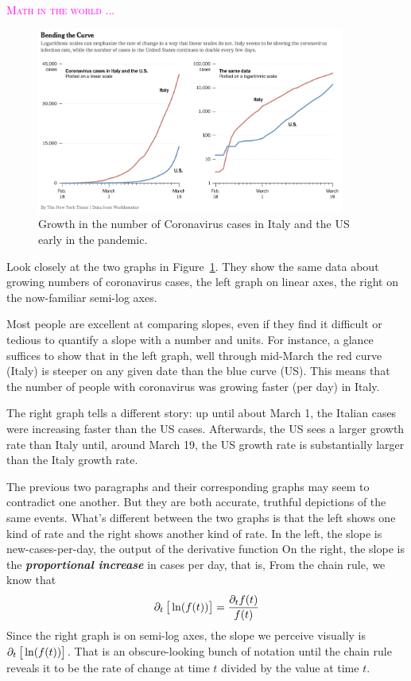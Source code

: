 \documentclass[
  letterpaper,
  DIV=11,
  numbers=noendperiod,
  oneside]{scrreprt}
\newenvironment{intheworld}%
{%
\textcolor{magenta}{\hrulefill}%
  \par\vspace{.3\baselineskip}%
  \textcolor{magenta}{\scshape Math in the world ...}%
  \par\vspace{\baselineskip}%
}%
{\textcolor{magenta}{\hrulefill}}
\begin{document}
\begin{intheworld}
\begin{figure}

{\centering \includegraphics[width=0.9\textwidth,height=\textheight]{Differentiation/www/NYT-italy-us-corona.png}

}

\caption{\label{fig-italy-us-covid}Growth in the number of Coronavirus
cases in Italy and the US early in the pandemic.}

\end{figure}

Look closely at the two graphs in Figure~\ref{fig-italy-us-covid}. They
show the same data about growing numbers of coronavirus cases, the left
graph on linear axes, the right on the now-familiar semi-log axes.

Most people are excellent at comparing slopes, even if they find it
difficult or tedious to quantify a slope with a number and units. For
instance, a glance suffices to show that in the left graph, well through
mid-March the red curve (Italy) is steeper on any given date than the
blue curve (US). This means that the number of people with coronavirus
was growing faster (per day) in Italy.

The right graph tells a different story: up until about March 1, the
Italian cases were increasing faster than the US cases. Afterwards, the
US sees a larger growth rate than Italy until, around March 19, the US
growth rate is substantially larger than the Italy growth rate.

The previous two paragraphs and their corresponding graphs may seem to
contradict one another. But they are both accurate, truthful depictions
of the same events. What's different between the two graphs is that the
left shows one kind of rate and the right shows another kind of rate. In
the left, the slope is new-cases-per-day, the output of the derivative
function On the right, the slope is the \textbf{\emph{proportional
increase}} in cases per day, that is, From the chain rule, we know that
\[\partial_t \left[\strut\ln(f(t))\right] = \frac{\partial_t f(t)}{f(t)}\]
Since the right graph is on semi-log axes, the slope we perceive
visually is \(\partial_t \left[\strut\ln(f(t))\right]\). That is an
obscure-looking bunch of notation until the chain rule reveals it to be
the rate of change at time \(t\) divided by the value at time \(t\).

\end{intheworld}
\end{document}
